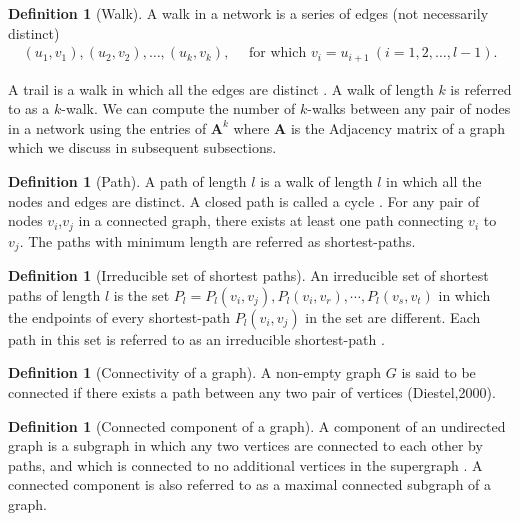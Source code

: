 \documentclass[10pt,a4paper]{article}
\theoremstyle{plain}
\theoremstyle{definition}
\newtheorem{defn}[subsection]{Definition}
\begin{document}
\begin{defn}[Walk]
	A walk in a network is a series of edges (not necessarily distinct)
	\begin{eqnarray*}
		(u_1,v_1),(u_2,v_2),\ldots,(u_k,v_k),\quad \text{ for which }  v_i=u_{i+1} ~(i=1,2,\ldots,l-1).
	\end{eqnarray*}
	
	A trail is a walk in which all the edges are distinct \citep{estrada2015first}. A walk of length $k$ is referred to as a $k$-walk. We can compute the number of $k$-walks between any pair of nodes in a network using the entries of $\mathbf{A}^k$ where $\mathbf{A}$ is the Adjacency matrix of a graph which we discuss in subsequent subsections.\\
\end{defn}

\begin{defn}[Path]
	A path of length $l$ is a walk of length $l$ in which all the nodes and edges are distinct. A closed path is called a cycle \citep{estrada2011structure}. For any pair of nodes $v_i$,$v_j$ in a connected graph, there exists at least one path connecting $v_i$ to $v_j$. The paths with minimum length are referred as shortest-paths.\\
\end{defn}

\begin{defn}[Irreducible set of shortest paths]
	
	An irreducible set of shortest paths of length $l$ is the set $P_l ={P_l(v_i,v_j),P_l(v_i,v_r),\cdots, P_l(v_s,v_t)}$ in which the endpoints of every shortest-path $P_l(v_i,v_j)$ in the set are different.
	Each path in this set is referred to as an irreducible shortest-path \citep{estrada2012path}.\\
\end{defn}


\begin{defn}[Connectivity of a graph]
	A non-empty graph $G$ is said to be connected if there exists a path between any two pair of vertices (Diestel,2000). \\
\end{defn}

\begin{defn}[Connected component of a graph]
	A component of an undirected graph is a subgraph in which any two vertices are connected to each other by paths, and which is connected to no additional vertices in the supergraph \citep{newman2010networks}. 
	A connected component is also referred to as a maximal connected subgraph of a graph. \\
\end{defn}
\end{document}
